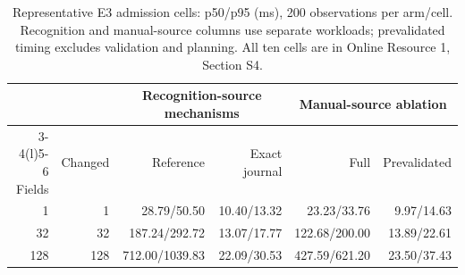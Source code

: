 \begin{table}[tb]
\centering
\footnotesize
\caption{Representative E3 admission cells: p50/p95 (ms), 200 observations per arm/cell. Recognition and manual-source columns use separate workloads; prevalidated timing excludes validation and planning. All ten cells are in Online Resource 1, Section S4.}
\label{tab:dke-admission-selected}
\setlength{\tabcolsep}{3pt}
\begin{tabular}{@{}rr r r r r@{}}
\toprule
 & & \multicolumn{2}{c}{Recognition-source mechanisms} & \multicolumn{2}{c}{Manual-source ablation} \\
\cmidrule(lr){3-4}\cmidrule(l){5-6}
Fields & Changed & Reference & Exact journal & Full & Prevalidated \\
\midrule
1 & 1 & 28.79/50.50 & 10.40/13.32 & 23.23/33.76 & 9.97/14.63 \\
32 & 32 & 187.24/292.72 & 13.07/17.77 & 122.68/200.00 & 13.89/22.61 \\
128 & 128 & 712.00/1039.83 & 22.09/30.53 & 427.59/621.20 & 23.50/37.43 \\
\bottomrule
\end{tabular}
\end{table}
